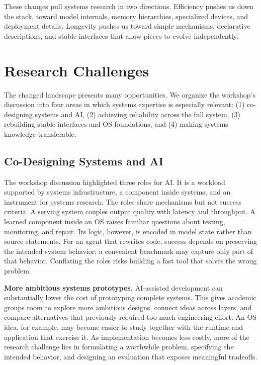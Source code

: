 \documentclass[manuscript]{acmart}
\begin{document}
These changes pull systems research in two directions.
Efficiency pushes us down the stack, toward model internals, memory hierarchies,
specialized devices, and deployment details.
Longevity pushes us toward simple mechanisms, declarative descriptions,
and stable interfaces that allow pieces to evolve independently.

\section{Research Challenges}

The changed landscape presents many opportunities.
We organize the workshop's discussion
into four areas in which systems expertise is especially relevant:
(1) co-designing systems and AI, (2) achieving reliability across the full system,
(3) rebuilding stable interfaces and OS foundations, and (4) making systems knowledge transferable.

\subsection{Co-Designing Systems and AI}

The workshop discussion highlighted three roles for AI.
It is a workload supported by systems infrastructure, a component inside systems, and an instrument for systems research.
The roles share mechanisms but not success criteria.
A serving system couples output quality with latency and throughput.
A learned component inside an OS raises familiar questions about testing, monitoring, and repair.
Its logic, however, is encoded in model state rather than source statements.
For an agent that rewrites code, success depends on preserving the intended system behavior;
a convenient benchmark may capture only part of that behavior.
Conflating the roles risks building a fast tool that solves the wrong problem.

\textbf{More ambitious systems prototypes.}
AI-assisted development can substantially lower the cost of prototyping complete systems.
This gives academic groups room to explore more ambitious designs, connect ideas across layers, and compare alternatives that previously required too much engineering effort.
An OS idea, for example, may become easier to study together with the runtime and application that exercise it.
As implementation becomes less costly, more of the research challenge lies in formulating a worthwhile problem, specifying the intended behavior, and designing an evaluation that exposes meaningful tradeoffs.
\end{document}
